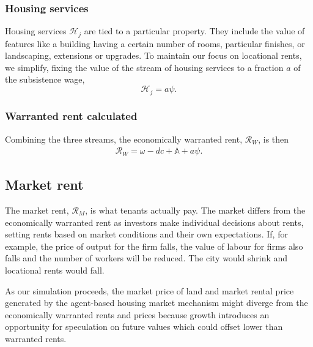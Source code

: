 \subsubsection{Housing services} \label{section-housing-services}
Housing services $\mathcal{H}_j$ are tied to a particular property. They include the value of features like a building having a certain number of rooms, particular finishes, or landscaping, extensions or upgrades. To maintain our focus on locational rents, we simplify, fixing %
the value of the stream of housing services to a fraction $a$ of the subsistence wage,
\[\mathcal{H}_j=a\psi.\]

\subsubsection{Warranted rent calculated}
Combining the three streams, the economically \gls{warranted rent}, $\mathcal{R}_W$, is then %
\begin{align}
\mathcal{R}_W=\omega - {dc} + \mathbb{A} + a\psi.
\label{eqn-warranted-rent}
\end{align}


\subsection{Market rent} \label{sec:market-rent}
The \gls{market rent}, $\mathcal{R}_M$, is what tenants actually pay. The market differs from the economically warranted rent as investors make individual decisions about rents, setting rents based on market conditions and their own expectations. If, for example, the price of output for the firm falls, the value of labour for firms also falls and the number of workers will be reduced. The city would shrink and locational rents would fall. %

As our simulation proceeds, the market price of land and market rental price generated by the agent-based housing market mechanism might diverge from the economically warranted rents and prices because growth introduces an opportunity for speculation on future values which could offset lower than warranted rents.

